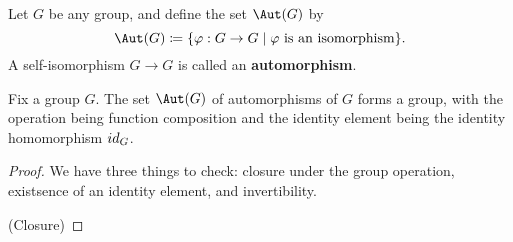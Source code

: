 \begin{definition}
    Let $G$ be any group, and define the set $\Aut(G)$ by
    \[
        \Aut(G) \coloneq \{ \phi: G\to G \mid \text{$\phi$ is an isomorphism}\}.
    \]
    A self-isomorphism $G\to G$ is called an {\bf automorphism}.
\end{definition}

\begin{proposition}
    Fix a group $G$. The set $\Aut(G)$ of automorphisms of $G$ forms a group,
    with the operation being function composition and the identity element being
    the identity homomorphism $id_G$.
\end{proposition}

\begin{proof}
    We have three things to check: 
    closure under the group operation, 
    existsence of an identity element,
    and invertibility.

    (Closure) 
\end{proof}